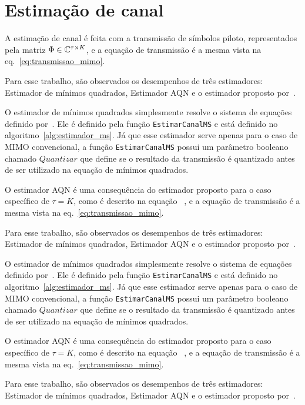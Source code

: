 \documentclass{article}
\begin{document}
\section{Estimação de canal}
\label{sec:estimacao_canal}

A estimação de canal é feita com a transmissão de símbolos piloto, representados pela matriz $\Phi\in\mathbb{C}^{\tau\times K}$, e a equação de transmissão é a mesma vista na eq.~\eqref{eq:transmissao_mimo}. 

Para esse trabalho, são observados os desempenhos de três estimadores: Estimador de mínimos quadrados, Estimador AQN e o estimador proposto por~\cite{li.etal_2017a}. 

O estimador de mínimos quadrados simplesmente resolve o sistema de equações definido por~\cite[eq. 4]{li.etal_2017a}. Ele é definido pela função \texttt{EstimarCanalMS} e está definido no algoritmo~\ref{alg:estimador_ms}. Já que esse estimador serve apenas para o caso de MIMO convencional, a função \texttt{EstimarCanalMS} possui um parâmetro booleano chamado $Quantizar$ que define se o resultado da transmissão é quantizado antes de ser utilizado na equação de mínimos quadrados. 

O estimador AQN é uma consequência do estimador proposto para o caso específico de $\tau=K$, como é descrito na equação~\cite[eq]{li.ets} 
, e a equação de transmissão é a mesma vista na eq.~\eqref{eq:transmissao_mimo}. 

Para esse trabalho, são observados os desempenhos de três estimadores: Estimador de mínimos quadrados, Estimador AQN e o estimador proposto por~\cite{li.etal_2017a}. 

O estimador de mínimos quadrados simplesmente resolve o sistema de equações definido por~\cite[eq. 4]{li.etal_2017a}. Ele é definido pela função \texttt{EstimarCanalMS} e está definido no algoritmo~\ref{alg:estimador_ms}. Já que esse estimador serve apenas para o caso de MIMO convencional, a função \texttt{EstimarCanalMS} possui um parâmetro booleano chamado $Quantizar$ que define se o resultado da transmissão é quantizado antes de ser utilizado na equação de mínimos quadrados. 

O estimador AQN é uma consequência do estimador proposto para o caso específico de $\tau=K$, como é descrito na equação~\cite[eq]{li.ets} 
, e a equação de transmissão é a mesma vista na eq.~\eqref{eq:transmissao_mimo}. 

Para esse trabalho, são observados os desempenhos de três estimadores: Estimador de mínimos quadrados, Estimador AQN e o estimador proposto por~\cite{li.etal_2017a}. 
\end{document}
